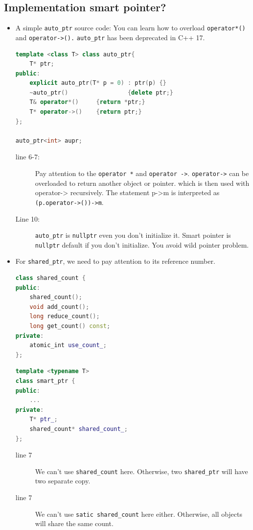 \documentclass[a4paper,11pt,twoside]{book}
\begin{document}
\subsection{Implementation smart pointer?}
\begin{itemize}

		\item A simple \texttt{auto\_ptr} source code: You can learn how to overload \texttt{operator*()} and \texttt{operator->().} \texttt{auto\_ptr} has been deprecated in C++ 17.
\begin{lstlisting}[frame=single, language=c++, mathescape=true]
template <class T> class auto_ptr{
    T* ptr;
public:
    explicit auto_ptr(T* p = 0) : ptr(p) {}
    ~auto_ptr()                 {delete ptr;}
    T& operator*()     {return *ptr;}
    T* operator->()    {return ptr;}
};

auto_ptr<int> aupr;
\end{lstlisting}

\begin{description}
	\item[line 6-7:] Pay attention to the \texttt{operator *} and \texttt{operator ->}. \texttt{operator->} can be overloaded to return another object or pointer. which is then used with operator-> recursively. The statement p->m is interpreted as \texttt{(p.operator->())->m}. 
	
	\item[Line 10:] \texttt{auto\_ptr} is \texttt{nullptr} even you don't initialize it. Smart pointer is \texttt{nullptr} default if you don't initialize. You avoid wild pointer problem.
\end{description}

	\item For \texttt{shared\_ptr}, we need to pay attention to its reference number. 
\begin{lstlisting}[frame=single, language=c++, mathescape=true]
class shared_count {
public:
	shared_count();
	void add_count();
	long reduce_count();
	long get_count() const;
private:
	atomic_int use_count_;
};
\end{lstlisting}

\begin{lstlisting}[frame=single, language=c++, mathescape=true]
template <typename T>
class smart_ptr {
public:  
	...
private:  
	T* ptr_;  
	shared_count* shared_count_;
};
\end{lstlisting}

\begin{description}
	\item[line 7] We can't use \texttt{shared\_count} here. Otherwise, two \texttt{shared\_ptr} will have two separate copy. 
	\item[line 7] We can't use \texttt{satic shared\_count} here either. Otherwise, all objects will share the same count.


\end{description}
\end{itemize}
\end{document}
